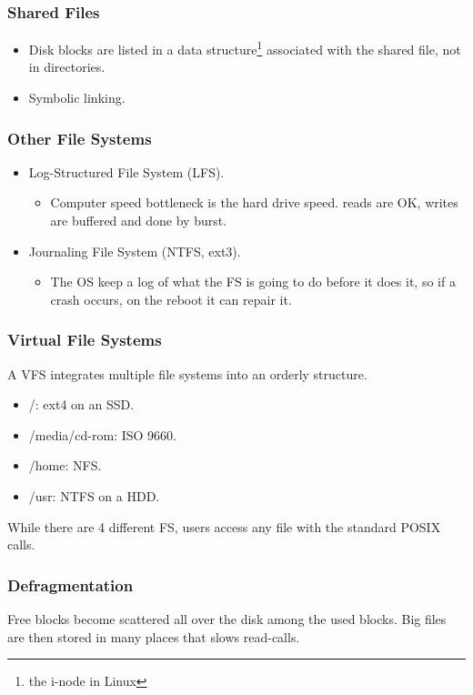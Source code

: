 \begin{frame}
    \frametitle{Shared Files}
    \begin{itemize}
        \item Disk blocks are listed in a data structure\footnote{the i-node in Linux} associated with the shared file, not in directories.
        \item Symbolic linking.
    \end{itemize}
\end{frame}

\begin{frame}
    \frametitle{Other File Systems}
    \begin{itemize}
        \item Log-Structured File System (LFS).
        \begin{itemize}
          \item Computer speed bottleneck is the hard drive speed. reads are OK, writes are buffered and done by burst.
        \end{itemize}
        \item Journaling File System (NTFS, ext3).
        \begin{itemize}
          \item The OS keep a log of what the FS is going to do before it does it, so if a crash occurs, on the reboot it can repair it.
        \end{itemize}
    \end{itemize}
\end{frame}

\begin{frame}
    \frametitle{Virtual File Systems}
    A VFS integrates multiple file systems into an orderly structure.
    \begin{itemize}
        \item /: ext4 on an SSD.
        \item /media/cd-rom: ISO 9660.
        \item /home: NFS.
        \item /usr: NTFS on a HDD.
    \end{itemize}
    While there are 4 different FS, users access any file with the standard POSIX calls.
\end{frame}

\begin{frame}
    \frametitle{Defragmentation}
    Free blocks become scattered all over the disk among the used blocks. Big files are then stored in many places that slows read-calls.
\end{frame}

